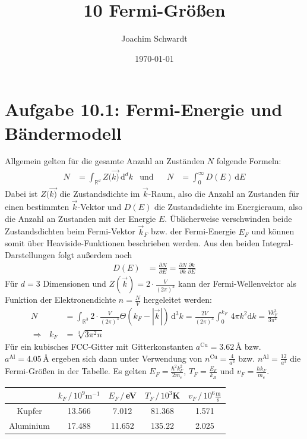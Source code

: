 \documentclass[a4paper,12pt]{article}
\newcommand{\intx}{}
\newcommand{\intr}{}
\newcommand{\kla}{}
\newcommand{\tecxt}{}
\begin{document}
\title{10 Fermi-Größen}
\author{Joachim Schwardt}
\date{\today}
\maketitle

\section*{Aufgabe 10.1: Fermi-Energie und Bändermodell}
Allgemein gelten für die gesamte Anzahl an Zuständen $N$ folgende Formeln:
\begin{align*}
N&=\intr\int_{\mathbb{R}^{d}}{Z(\vec{k)}}\,\mathrm{d}^{d}k&\tecxt\text{und}&&N&=\intx\int_{0}^{\infty}D(E)\,\mathrm{d}E
\end{align*}
Dabei ist $Z(\vec{k)}$ die Zustandsdichte im $\vec{k}$-Raum, also die Anzahl an Zustanden für einen bestimmten $\vec{k}$-Vektor und $D(E)$ die Zustandsdichte im Energieraum, also die Anzahl an Zustanden mit der Energie $E$. Üblicherweise verschwinden beide Zustandsdichten beim Fermi-Vektor $\vec{k}_F$ bzw. der Fermi-Energie $E_F$ und können somit über Heaviside-Funktionen beschrieben werden. Aus den beiden Integral-Darstellungen folgt außerdem noch
\begin{align*}
D(E)&=\frac{\partial N}{\partial E}=\frac{\partial N}{\partial k}\frac{\partial k}{\partial E}
\end{align*}
Für $d=3$ Dimensionen und $Z(\vec{k})=2\cdot\frac{V}{(2\pi)^3}$ kann der Fermi-Wellenvektor als Funktion der Elektronendichte $n=\frac{N}{V}$ hergeleitet werden:
\begin{align*}
N&=\intr\int_{\mathbb{R}^{3}}{2\cdot\frac{V}{(2\pi)^3}\Theta\kla\left( {k_F-|\vec{k}|} \right)}\,\mathrm{d}^{3}k=\frac{2V}{(2\pi)^3}\intx\int_{0}^{k_F}\,4\pi k^2\mathrm{d}k=\frac{Vk_F^3}{3\pi^2}\\
\Rightarrow\ \ \ k_F&=\sqrt[3]{3\pi^2n}
\end{align*}
Für ein kubisches FCC-Gitter mit Gitterkonstanten $a^\tecxt\text{Cu}=3.62\,\tecxt\text{\AA}$ bzw. $a^\tecxt\text{Al}=4.05\,\tecxt\text{\AA}$ ergeben sich dann unter Verwendung von $n^\tecxt\text{Cu}=\frac{4}{a^3}$ bzw. $n^\tecxt\text{Al}=\frac{12}{a^3}$ die Fermi-Größen in der Tabelle. Es gelten $E_F=\frac{\hbar^2k_F^2}{2m_e}$, $T_F=\frac{E_F}{k_B}$ und $v_F=\frac{\hbar k_F}{m_e}$.
\begin{table}[h!]
\centering
\begin{tabular}{c|c|c|c|c}
&$k_F\,/\,10^9\tecxt\text{m}^{-1}$&$E_F\,/\,$eV&$T_F\,/\,10^3$K&$v_F\,/\,10^6\frac{\tecxt\text{m}}{\tecxt\text{s}}$\\ \hline
Kupfer&13.566 & 7.012 & 81.368 & 1.571 \\ \hline
Aluminium&17.488 & 11.652 & 135.22 & 2.025 \\ 
\end{tabular}
\end{table}\\
\end{document}
